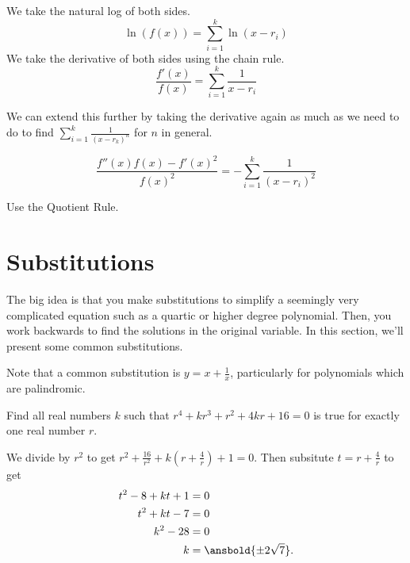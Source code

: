 \documentclass{article}
\begin{document}
\begin{pro}
We take the natural log of both sides.
$$\ln (f(x)) = \sum_{i=1}^{k} \ln(x-r_{i})$$
We take the derivative of both sides using the chain rule.
$$\frac{f'(x)}{f(x)} = \sum_{i=1}^{k} \frac{1}{x-r_{i}}$$
\end{pro}

We can extend this further by taking the derivative again as much as we need to do to find $\sum_{i=1}^{k} \frac{1}{(x-r_{k})^n}$ for $n$ in general.
\begin{theo}
$$\frac{f''(x)f(x)-f'(x)^2}{f(x)^2} = -\sum_{i=1}^{k} \frac{1}{(x-r_{i})^2}$$
\end{theo}

\begin{pro}
Use the Quotient Rule.
\end{pro}
\newpage

\section{Substitutions}
The big idea is that you make substitutions to simplify a seemingly very complicated equation such as a quartic or higher degree polynomial. Then, you work backwards to find the solutions in the original variable. In this section, we'll present some common substitutions.


Note that a common substitution is $y=x+\frac{1}{x}$, particularly for polynomials which are palindromic.

\begin{exam}
Find all real numbers $k$ such that $r^4+kr^3+r^2+4kr+16=0$ is true for exactly one real number $r$.
\end{exam}

\begin{sol}
We divide by $r^2$ to get $r^2+\frac{16}{r^2} + k(r+\frac{4}{r})+1=0$. Then subsitute $t=r+\frac{4}{r}$ to get
\begin{align*}
t^2-8+kt+1 &= 0\\
t^2+kt-7&=0\\
k^2-28&=0\\
k &= \ansbold{\pm 2\sqrt{7}}.
\end{align*}
\end{sol}
\end{document}
